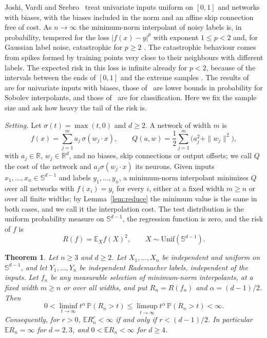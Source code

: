 \documentclass[11pt]{amsart}
\newtheorem{theorem}{Theorem}[section]
\theoremstyle{remark}
\numberwithin{equation}{section}
\newcommand{\EE}{\mathbb{E}}
\newcommand{\PP}{\mathbb{P}}
\newcommand{\RR}{\mathbb{R}}
\newcommand{\Sph}{\mathbb{S}^{d-1}}
\begin{document}
Joshi, Vardi and Srebro~\cite{JVS} treat univariate inputs uniform on $[0,1]$ and networks with biases, with the biases included in the norm and an affine skip connection free of cost. As $n\to\infty$ the minimum-norm interpolant of noisy labels is, in probability, tempered for the loss $|f(x)-y|^p$ with exponent $1\le p<2$ \cite[Theorems~2 and~3]{JVS} and, for Gaussian label noise, catastrophic for $p\ge2$ \cite[Theorem~4]{JVS}. The catastrophic behaviour comes from spikes formed by training points very close to their neighbours with different labels. The expected risk in this loss is infinite already for $p<2$, because of the intervals between the ends of $[0,1]$ and the extreme samples \cite[(10)]{JVS}. The results of~\cite{JVS} are for univariate inputs with biases, those of~\cite{KSNM} are lower bounds in probability for Sobolev interpolants, and those of~\cite{KYS} are for classification. Here we fix the sample size and ask how heavy the tail of the risk is.

\medskip\noindent\emph{Setting.}
Let $\sigma(t)=\max(t,0)$ and $d\ge2$. A network of width $m$ is
\begin{equation}\label{eq:net}
f(x)=\sum_{j=1}^m a_j\,\sigma(w_j\cdot x),\qquad Q(a,w)=\frac12\sum_{j=1}^m\bigl(a_j^2+\|w_j\|^2\bigr),
\end{equation}
with $a_j\in\RR$, $w_j\in\RR^d$, and no biases, skip connections or output offsets; we call $Q$ the cost of the network and $a_j\sigma(w_j\cdot x)$ its neurons. Given inputs $x_1,\dots,x_n\in\Sph$ and labels $y_1,\dots,y_n$, a minimum-norm interpolant minimizes $Q$ over all networks with $f(x_i)=y_i$ for every $i$, either at a fixed width $m\ge n$ or over all finite widths; by Lemma~\ref{lem:reduce} the minimum value is the same in both cases, and we call it the interpolation cost. The test distribution is the uniform probability measure on $\Sph$, the regression function is zero, and the risk of $f$ is
\[
R(f)=\EE_X f(X)^2,\qquad X\sim\mathrm{Unif}(\Sph).
\]

\begin{theorem}\label{thm:main}
Let $n\ge3$ and $d\ge2$. Let $X_1,\dots,X_n$ be independent and uniform on $\Sph$, and let $Y_1,\dots,Y_n$ be independent Rademacher labels, independent of the inputs. Let $f_n$ be any measurable selection of minimum-norm interpolants, at a fixed width $m\ge n$ or over all widths, and put $R_n=R(f_n)$ and $\alpha=(d-1)/2$. Then
\begin{equation}\label{eq:tail}
0<\liminf_{t\to\infty}t^{\alpha}\,\PP(R_n>t)\le\limsup_{t\to\infty}t^{\alpha}\,\PP(R_n>t)<\infty .
\end{equation}
Consequently, for $r>0$, $\EE R_n^r<\infty$ if and only if $r<(d-1)/2$. In particular $\EE R_n=\infty$ for $d=2,3$, and $0<\EE R_n<\infty$ for $d\ge4$.
\end{theorem}
\end{document}
